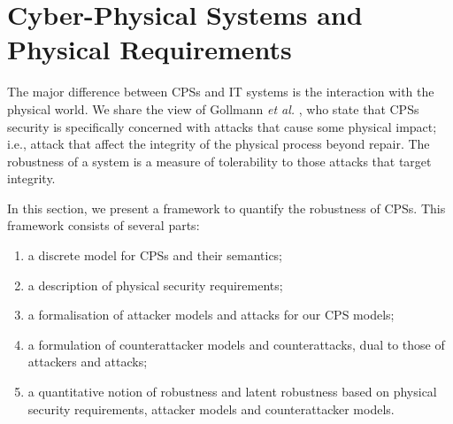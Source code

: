 \section{Cyber-Physical Systems and Physical Requirements}
The major difference between CPSs and IT systems is the interaction with the physical world. We share the view of Gollmann \emph{et al.} \cite{CPSSecVinyl}, who state that CPSs security is {specifically} concerned with attacks that cause some physical impact; i.e., attack that affect the integrity of the physical process beyond repair. The robustness of a system is a measure of tolerability to those attacks that target integrity. 

In this section, we present a framework to quantify the robustness of CPSs. This framework consists of several parts:
\begin{enumerate}
  \item a discrete model for CPSs and their semantics; 
  \item a description of physical security requirements;
  \item a formalisation of attacker models and attacks for our CPS models;
  \item a formulation of counterattacker models and counterattacks, dual to those of attackers and attacks;
  \item a quantitative notion of robustness and latent robustness based on physical security requirements, attacker models and counterattacker models.
\end{enumerate}

